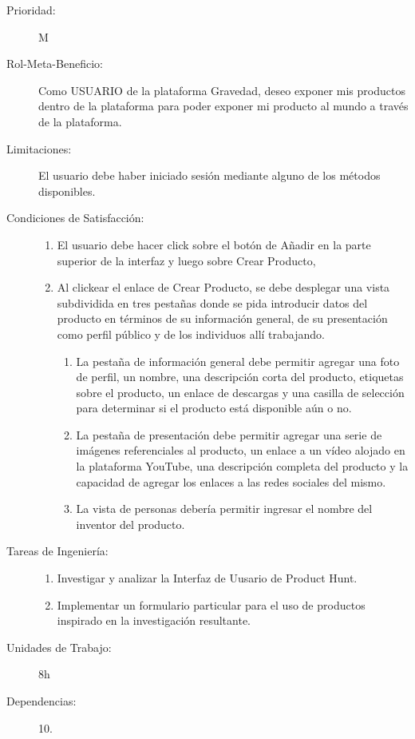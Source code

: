 \begin{description}
    \item[Prioridad:] M
    \item[Rol-Meta-Beneficio:] Como USUARIO de la plataforma Gravedad, deseo exponer mis productos dentro de la plataforma para poder exponer mi producto al mundo a través de la plataforma.
    \item[Limitaciones:] El usuario debe haber iniciado sesión mediante alguno de los métodos disponibles.
    \item[Condiciones de Satisfacción:]  \hfill
        \begin{enumerate}
            \item El usuario debe hacer click sobre el botón de Añadir en la parte superior de la interfaz y luego sobre Crear Producto,
    		\item Al clickear el enlace de Crear Producto, se debe desplegar una vista subdividida en tres pestañas donde se pida introducir datos del producto en términos de su información general, de su presentación como perfil público y de los individuos allí trabajando.
    	    \begin{enumerate}
    	        \item La pestaña de información general debe permitir agregar una foto de perfil, un nombre, una descripción corta del producto, etiquetas sobre el producto, un enlace de descargas y una casilla de selección para determinar si el producto está disponible aún o no.
    			\item La pestaña de presentación debe permitir agregar una serie de imágenes referenciales al producto, un enlace a un vídeo alojado en la plataforma YouTube, una descripción completa del producto y la capacidad de agregar los enlaces a las redes sociales del mismo.
    			\item La vista de personas debería permitir ingresar el nombre del inventor del producto.
    	    \end{enumerate}
    			
        \end{enumerate}
    \item[Tareas de Ingeniería:]  \hfill
        \begin{enumerate}
            \item Investigar y analizar la Interfaz de Uusario de Product Hunt.
	    	\item Implementar un formulario particular para el uso de productos inspirado en la investigación resultante.
        \end{enumerate}
    \item[Unidades de Trabajo:] 8h
    \item[Dependencias:] 10.
\end{description}

